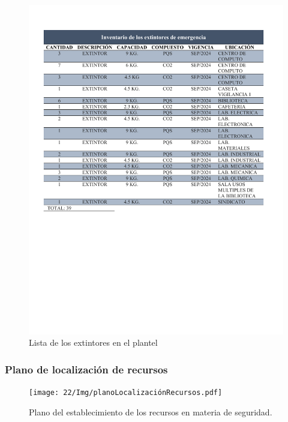     \begin{figure}[H]
      \centering
      \includegraphics[trim = {11mm 100mm 12mm 15mm},clip,scale=0.4]{22/Img/inventarioDeExtintores.pdf}
       \caption{Lista de los extintores en el plantel}
       \label{fig:Extintores}
     \end{figure}
    
    
    \subsubsection{Plano de localización de recursos}
    
    \begin{figure}[H]
      \centering
      \texttt{[image: 22/Img/planoLocalizaciónRecursos.pdf]}
       \caption{Plano del establecimiento de los recursos en materia de seguridad.}
       \label{fig:PlanoLocalizaciónRecursos}
     \end{figure}
    

